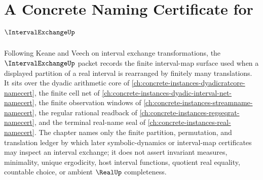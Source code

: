 \chapter{A Concrete Naming Certificate for $\IntervalExchangeUp$}
\label{ch:concrete-instances-interval-exchange-namecert}

Following Keane and Veech on interval exchange transformations, the $\IntervalExchangeUp$ packet records the finite interval-map surface used when a displayed partition of a real interval is rearranged by finitely many translations. It sits over the dyadic arithmetic core of \autoref{ch:concrete-instances-dyadicratcore-namecert}, the finite cell net of \autoref{ch:concrete-instances-dyadic-interval-net-namecert}, the finite observation windows of \autoref{ch:concrete-instances-streamname-namecert}, the regular rational readback of \autoref{ch:concrete-instances-regseqrat-namecert}, and the terminal real-name seal of \autoref{ch:concrete-instances-real-namecert}. The chapter names only the finite partition, permutation, and translation ledger by which later symbolic-dynamics or interval-map certificates may inspect an interval exchange; it does not assert invariant measures, minimality, unique ergodicity, host interval functions, quotient real equality, countable choice, or ambient $\RealUp$ completeness.

